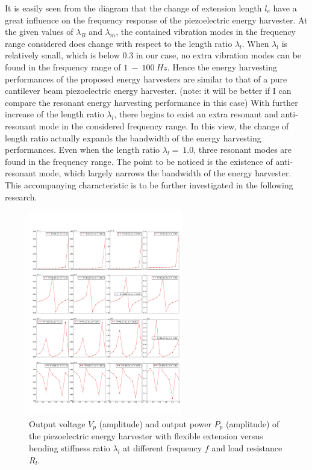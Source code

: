 \documentclass{elsarticle}
\begin{document}
It is easily seen from the diagram that the change of extension length $l_e$ have a great influence on the frequency response of the piezoelectric energy harvester. At the given values of $\lambda_B$ and $\lambda_m$, the contained vibration modes in the frequency range considered does change with respect to
the length ratio $\lambda_l$. When $\lambda_l$ is relatively small, which is below $0.3$ in our case, no extra vibration modes can be found in the frequency range of $1\ - \ 100\ Hz$. Hence the energy harvesting performances of the proposed energy harvesters are similar to that of a pure cantilever beam piezoelectric energy harvester. (note: it will be better if I can compare the resonant energy harvesting performance in this case) With further increase of the length ratio $\lambda_l$, there begins to exist an extra resonant and anti-resonant mode in the considered frequency range. In this view, the change of length ratio actually expands the bandwidth of the energy harvesting performances. Even when the length ratio $\lambda_l =\ 1.0$, three resonant modes are found in the frequency range. The point to be noticed is the existence of anti-resonant mode, which largely narrows the bandwidth of the energy harvester. This accompanying characteristic is to be further investigated in the following research. 

\begin{figure}[!htbp]
    \centering
    \includegraphics[width=0.6\textwidth]{./fig_vol_fr_sl_Rl_sl_vs_laml}
    \caption{Output voltage $V_p$ (amplitude) and output power $P_p$ (amplitude) of the piezoelectric energy harvester with flexible extension versus bending stiffness ratio $\lambda_l$ at different frequency $f$ and load resistance $R_l$. }
    \label{fig:fig_vol_fr_sl_Rl_sl_vs_laml}
\end{figure}
\end{document}

